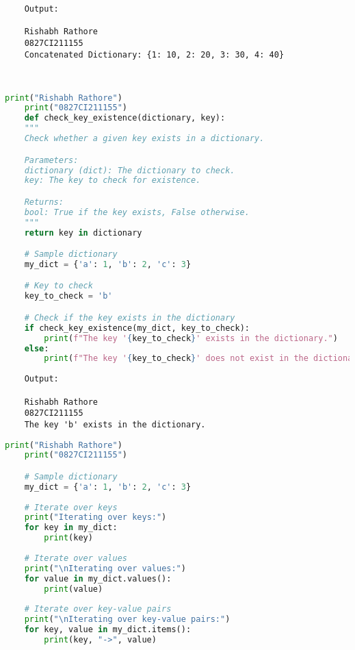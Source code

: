 \documentclass{report}
\begin{document}
\begin{verbatim}
	Output:

	Rishabh Rathore
	0827CI211155
	Concatenated Dictionary: {1: 10, 2: 20, 3: 30, 4: 40}

	

\end{verbatim}


\bigskip


\sol 
\begin{lstlisting}[language=Python]
	print("Rishabh Rathore")
	print("0827CI211155")
	def check_key_existence(dictionary, key):
    """
    Check whether a given key exists in a dictionary.

    Parameters:
    dictionary (dict): The dictionary to check.
    key: The key to check for existence.

    Returns:
    bool: True if the key exists, False otherwise.
    """
    return key in dictionary

	# Sample dictionary
	my_dict = {'a': 1, 'b': 2, 'c': 3}

	# Key to check
	key_to_check = 'b'

	# Check if the key exists in the dictionary
	if check_key_existence(my_dict, key_to_check):
		print(f"The key '{key_to_check}' exists in the dictionary.")
	else:
		print(f"The key '{key_to_check}' does not exist in the dictionary.")
\end{lstlisting}

\begin{verbatim}
	Output:

	Rishabh Rathore
	0827CI211155
	The key 'b' exists in the dictionary.	

\end{verbatim}



\bigskip


\sol 
\begin{lstlisting}[language=Python]
	print("Rishabh Rathore")
	print("0827CI211155")

	# Sample dictionary
	my_dict = {'a': 1, 'b': 2, 'c': 3}
	
	# Iterate over keys
	print("Iterating over keys:")
	for key in my_dict:
		print(key)
	
	# Iterate over values
	print("\nIterating over values:")
	for value in my_dict.values():
		print(value)
	
	# Iterate over key-value pairs
	print("\nIterating over key-value pairs:")
	for key, value in my_dict.items():
		print(key, "->", value)
	

\end{lstlisting}
\end{document}

